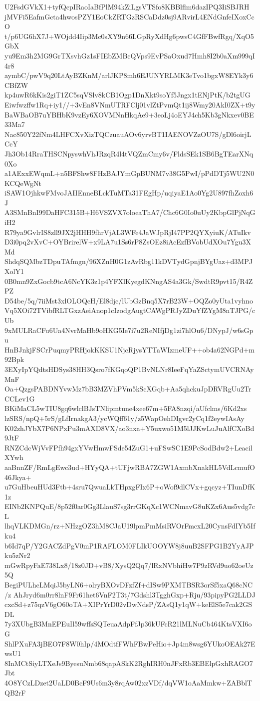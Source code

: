 U2FsdGVkX1+tyfQcpIRaoIaBfPlM94kZiLgsVTSfo8KBBlflm6dazIPQ3IiSBJRH
jMVFi5EafmGcta4hwosPZY1EoCkZRTGzRSCaDdz0sj9ARvirL4ENdGnfeIXoxCcO
t/p6UG6hX7J+WOjdd4Iip3Mc0sXY9n66LGpRyXdHg6pwsC4GfFBwfRgq/XqO5GbX
yu9Em3h2MG9GrTXsvhGz1sFIEbZMBcQVps9EvPSaOxud7Hmh8I2b0aXm999qI4r8
aymbC/pwV9q20LtAyBZKnM/arlJKP8mh6EJUNYRLMK3eTvo1bgxW8EYk3y6CBfZW
kp4uwR6kKis2giT1ZC5sqVSlv8kCB1Ogp1DnXkt9soYf5Jngx1tENjPtK/b2tgUG
Eiwfwzffw1Rq+iy1//+3vEn8VNmUTRFClj01vlZtPvmQt1ij8Wmy20AkI0ZX+t9y
BaWBaOB7uYBHbK9vzEy6XOVMNnHkqAe9+3eoLj4oEYJ4ch5Kb3gNkxev0BE33Ma7
Nac850Y22fNm4LHFCXvXizTQCzuauAOv6yrvBT1IAENOVZzOU7S/gDl6oirjLCcY
Jh3Ob14RraTHSCNpyswhVhJRzqR4l4tVQZmCmy6v/FldsSEk1SB6BgTEarXNq0Xo
a1AExxEWqmL+n5BFShw8FHzBAJYmGpBUNM7v38G5PwI/pPdDTj5WU2N0KCQeWgNt
iSAW1OjhkwFMvoJAIIEnneBLckTuMTa31FEgHp/uqiyaE1Ao0Yg2U897fhZoxh6J
A3SMnBnI99DaHFC315B+H6VSZVX7oloeaThA7/Chc6G0Io0uUy2KbpGlPjNqGiH2
R79ya9GvlrIS8zll9JX2jHHH9fhrVjAL3WFe4JaWJpRjI47PP2QYXyiuK/ATuIkv
D3i0pq2vXvC+OYBrirelW+x9LA7u1Ss6rP8ZsOEz8iAcEzfBVobUdXOu7Ygu3XMd
ShdqSQMbzTDpuTAfmgn/96XZnH0G1zAvRbg11kDVTydGpnjBYgUaz+d3MPJXolY1
0B0mn9ZxGocb9tcA6NcYK3z1p4YFXlKyegdKNngAS4a3Gk/SwdtR9pvt15/R4ZPZ
D54be/5q/7iiMst3xlOLOQcH/El8djc/lUbGzBnq5X7rB23W+OQZo0yUta1vyhno
Vq5XOi72TVibfRLTGxzAeiAnop1cIzodgAugtCAWgPRJyZDuYfZYgM8nTJPG/cUb
9xMULRaCFu6Ua4NvrMaHb9oHKG5Ie7i7u2ReNIfjDg1zi7hlOu6/DNypJ/w6sGpu
HnBJnkjFSCrPuqmyPRHjokKKSU1NjcRjysYTTaWIzmeUF++ob4a62NGPd+m92Bpk
3EXyIpYQdtsHDSys38HH3Qsro7fKGqoQP1BvNLNr8IeeFqYaZSctymUVCRNAyMnF
Oa+QzgsPABDNYvwMz7bB3MZVhPVm5kScXGqb+Aa5qhckuJpDRVRgUu2TrCCLev1G
BKiMaCL5wTIU8gq6wlclBJsTNlipmtune4xee67m+5FA8nzqi/aUfclms/6Kd2xs
lzSRS/npQ+5rS/gLfIrnakgA3/ycWQff61y/z5WapOehDIgvc2yCq1f2eywIAsAy
K02zhJYbX7P6NPxPu3mAXD8VX/ao3nxa+Y5uxwo51M5lJJKwLuJuAlfCXoBd9JtF
RNZCdcWjVvFPfh94gxYVwHmwFSde54ZuG1+uFSwSC1E9PcSodBdw2+LeacilXYwh
aaBnnZF/RmLgEwc3ud+HYyQA+tUFjwRBA7ZGW1AxmbXnakHL5VdLcmufO46Jkya+
u7GuHbeuHUd3Ftb+4sru7QwuaLkTHpxgFIx6P+oWof9dlCVx+gqcyz+TIunDfK1z
EINb2KNPQuE/8p52f0ar0Gg3LlauS7sg3rrGKqXc1WCNmavG8uKZx6Aus5vdg7cL
lhqVLKDMGn/rz+NHzgOZ3hM8CJaU19lpmPmMsiRVOrFmcxL20CynsFdIYb5Ifku4
b6Id7qP/Y2GACZdPgV0mP1RAFLOM0FLIkUOOYW8j8uuB2SFPG1B2YyAJPku5zNr2
mGwRpyFaE738Lx8/18z0JD+vB8/XysQ2Qq7/lRxNVbhiHw7P9zRVd9uo62oeUz5Q
BegiPULhcLMqiJ5byLN6+olryBXOvDFzfZf+dISw9PXMTBSR3orSf5xaQ68cNC/z
AhJryd6m0rr8lnF9Fr61het6VnF2T3t/7Gdshl3TgghGxp+Rju/93pipyPG2LLDJ
cxcSd+z75qzV6gO60oTA+XIPrYrD02vDwNdsP/ZAsQ1y1qW+keElS5e7cak2GSDL
7y3XUbgB3MnEPEuIl59wffsSQTeuaAdpFfJp36kUFcR21lMLNuCb464KtsVXI6oG
ShlPXuFA3jBEO7F8W0hIp/4MOdtfFWhFBwPeHio+Jp4m8wsg6YUkoOEAk27EwsU1
8InMCtSiyLTXeJs9ByesuNmb68qapASkK2RghIRH0nJFxRb3EBElpGxhRAGO7Jbt
4O8YCzLDzet2UaLD0BcF9Us6m3y8rqAw02xzVDf/dqVW1oAaMmkw+ZABblTQB2rF
